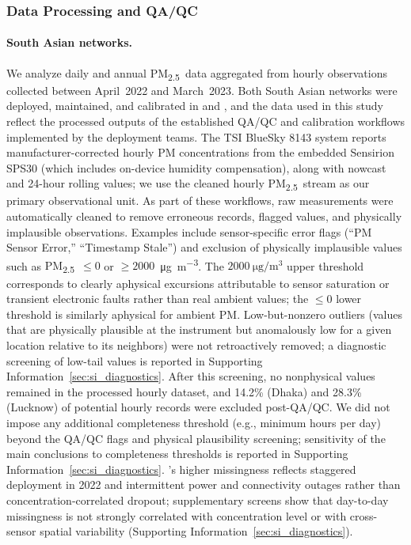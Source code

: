 \documentclass[12pt]{article}
\theoremstyle{remark}
\newcommand{\pmtt}{\textrm{PM\textsubscript{2.5}}}
\newcommand{\units}{\si{\micro\gram\per\cubic\meter}}
\newcommand{\city}[1]{\capitalisewords{\MakeLowercase{#1}}}
\begin{document}
\subsubsection{Data Processing and QA/QC}\label{sec:qaqc}

\paragraph{South Asian networks.} We analyze daily and annual \pmtt\ data aggregated from hourly observations collected between April~2022 and March~2023. Both South Asian networks were deployed, maintained, and calibrated in \city{Lucknow} and \city{Dhaka}, and the data used in this study reflect the processed outputs of the established QA/QC and calibration workflows implemented by the deployment teams.\supercite{jain_hybrid_2024, madhwal_evaluation_2024, zaman_comparison_2025, shrestha_field_2025} The TSI BlueSky 8143 system reports manufacturer-corrected hourly PM concentrations from the embedded Sensirion SPS30 (which includes on-device humidity compensation), along with nowcast and 24-hour rolling values; we use the cleaned hourly \pmtt\ stream as our primary observational unit. As part of these workflows, raw measurements were automatically cleaned to remove erroneous records, flagged values, and physically implausible observations. Examples include sensor-specific error flags (``PM Sensor Error,'' ``Timestamp Stale'') and exclusion of physically implausible values such as \pmtt\ $\le 0$ or $\ge 2000$~\units. The $2000~\units$ upper threshold corresponds to clearly aphysical excursions attributable to sensor saturation or transient electronic faults rather than real ambient values; the $\le 0$ lower threshold is similarly aphysical for ambient PM. Low-but-nonzero outliers (values that are physically plausible at the instrument but anomalously low for a given location relative to its neighbors) were not retroactively removed; a diagnostic screening of low-tail values is reported in Supporting Information~\ref{sec:si_diagnostics}. After this screening, no nonphysical values remained in the processed hourly dataset, and 14.2\% (Dhaka) and 28.3\% (Lucknow) of potential hourly records were excluded post-QA/QC. We did not impose any additional completeness threshold (e.g., minimum hours per day) beyond the QA/QC flags and physical plausibility screening; sensitivity of the main conclusions to completeness thresholds is reported in Supporting Information~\ref{sec:si_diagnostics}. \city{Lucknow}'s higher missingness reflects staggered deployment in 2022 and intermittent power and connectivity outages rather than concentration-correlated dropout; supplementary screens show that day-to-day missingness is not strongly correlated with concentration level or with cross-sensor spatial variability (Supporting Information~\ref{sec:si_diagnostics}).
\end{document}
